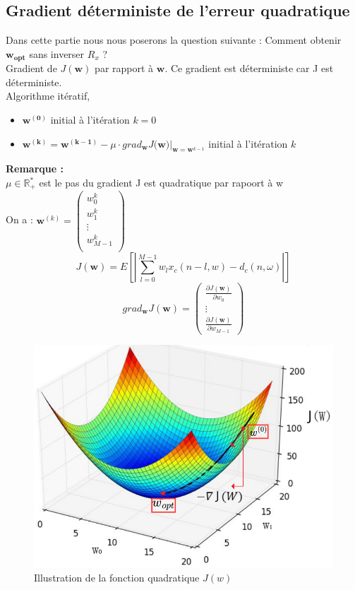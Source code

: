 \documentclass[12pt]{article}
\begin{document}
\subsection{Gradient déterministe de l'erreur quadratique}
Dans cette partie nous nous poserons la question suivante : Comment obtenir $\mathbf{w_{opt}}$ sans inverser $R_x$ ?\\
Gradient de $J(\mathbf{w})$ par rapport à $\mathbf{w}$. Ce gradient est déterministe car J est déterministe.\\
Algorithme itératif, 
\begin{itemize}
    \item $\mathbf{w^{(0)}}$ initial à l'itération $k=0$
    \item $\mathbf{w^{(k)}} = \mathbf{w^{(k-1)}} - \mu \cdot grad_{\mathbf{w}}J(\mathbf{w)} \Big|_{\mathbf{w} = \mathbf{w}^{k-1}}$ 
    initial à l'itération $k$
    
\end{itemize}
\textbf{Remarque :}\\
$\mu \in \mathbb{R}_+^*$ est le pas du gradient
J est quadratique par rapoort à w \\
On a : $\mathbf{w}^{(k)}= 
\begin{pmatrix}
    w_0^{k} \\
    w_1^{k} \\
    \vdots \\
    w_{M-1}^{k} \\
\end{pmatrix}$
$$J(\mathbf{w}) = E \left[ | \sum_{l=0}^{M-1} w_l x_c (n-l,w) - d_c(n,\omega)|\right]$$
$$grad_{\mathbf{w}}J(\mathbf{w}) = 
\begin{pmatrix}
    \frac{\partial J(\mathbf{w})}{\partial w_0} \\
    \vdots \\
    \frac{\partial J(\mathbf{w})}{\partial w_{M-1}}
\end{pmatrix}$$
\begin{figure}[H]
    \centering
    \includegraphics[width=0.8\linewidth]{grad.png}
    \caption{Illustration de la fonction quadratique $J(w)$}
\end{figure}
\end{document}

